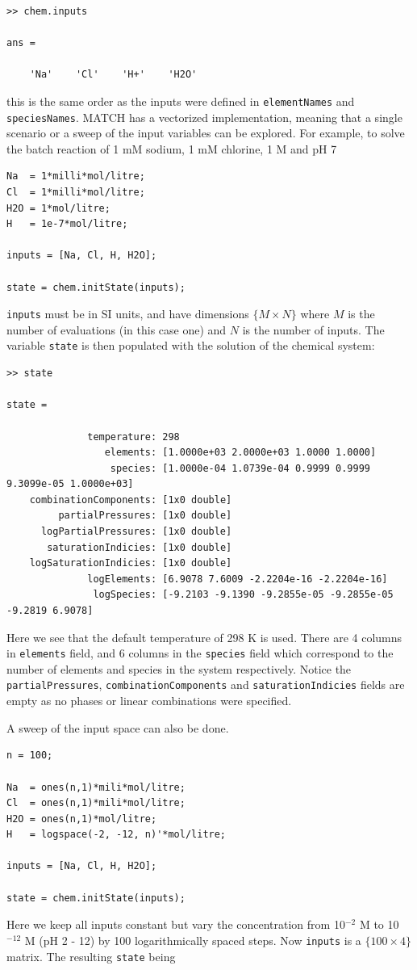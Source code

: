 \documentclass{article}
\begin{document}
\begin{lstlisting}
>> chem.inputs

ans = 

    'Na'    'Cl'    'H+'    'H2O'
\end{lstlisting}
this is the same order as the inputs were defined in \verb|elementNames| and \verb|speciesNames|. MATCH has a vectorized implementation, meaning that a single scenario or a sweep of the input variables can be explored.  For example, to solve the batch reaction of 1 mM sodium, 1 mM chlorine, 1 M  and pH 7

\begin{lstlisting}
Na  = 1*milli*mol/litre;
Cl  = 1*milli*mol/litre;
H2O = 1*mol/litre;
H   = 1e-7*mol/litre;

inputs = [Na, Cl, H, H2O];

state = chem.initState(inputs);
\end{lstlisting}
\verb|inputs| must be in SI units, and have dimensions $\{M\times N\}$ where $M$ is the number of evaluations (in this case one) and $N$ is the number of inputs. The variable \verb|state| is then populated with the solution of the chemical system:

\begin{lstlisting}
>> state

state = 

              temperature: 298
                 elements: [1.0000e+03 2.0000e+03 1.0000 1.0000]
                  species: [1.0000e-04 1.0739e-04 0.9999 0.9999 9.3099e-05 1.0000e+03]
    combinationComponents: [1x0 double]
         partialPressures: [1x0 double]
      logPartialPressures: [1x0 double]
       saturationIndicies: [1x0 double]
    logSaturationIndicies: [1x0 double]
              logElements: [6.9078 7.6009 -2.2204e-16 -2.2204e-16]
               logSpecies: [-9.2103 -9.1390 -9.2855e-05 -9.2855e-05 -9.2819 6.9078]
\end{lstlisting}
Here we see that the default temperature of 298 \textdegree K is used. There are 4 columns in \verb|elements| field, and 6 columns in the \verb|species| field which correspond to the number of elements and species in the system respectively. Notice the \verb|partialPressures|, \verb|combinationComponents| and \verb|saturationIndicies| fields are empty as no phases or linear combinations were specified. 

A sweep of the input space can also be done.

\begin{lstlisting}
n = 100;

Na  = ones(n,1)*mili*mol/litre;
Cl  = ones(n,1)*mili*mol/litre;
H2O = ones(n,1)*mol/litre;
H   = logspace(-2, -12, n)'*mol/litre;

inputs = [Na, Cl, H, H2O];

state = chem.initState(inputs);
\end{lstlisting}
Here we keep all inputs constant but vary the  concentration from 10$^{-2}$ M to 10$^{-12}$ M (pH 2 - 12) by 100 logarithmically spaced steps. Now \verb|inputs| is a $\{100\times 4\}$ matrix. The resulting \verb|state| being
\end{document}
